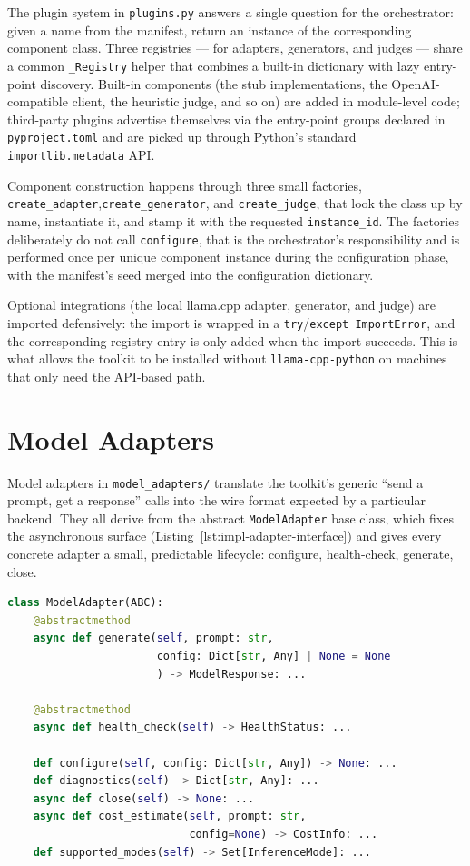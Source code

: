 The plugin system in \texttt{plugins.py} answers a single question for the orchestrator: given a name from the manifest, return an instance of the corresponding component class.
Three registries --- for adapters, generators, and judges --- share a common \texttt{\_Registry} helper that combines a built-in dictionary with lazy entry-point discovery.
Built-in components (the stub implementations, the OpenAI-compatible client, the heuristic judge, and so on) are added in module-level code; third-party plugins advertise themselves via the entry-point groups declared in \texttt{pyproject.toml} and are picked up through Python's standard \texttt{importlib.metadata} API.

Component construction happens through three small factories, \texttt{create\_adapter},\newline \texttt{create\_generator}, and \texttt{create\_judge}, that look the class up by name, instantiate it, and stamp it with the requested \texttt{instance\_id}.
The factories deliberately do not call \texttt{configure}, that is the orchestrator's responsibility and is performed once per unique component instance during the configuration phase, with the manifest's seed merged into the configuration dictionary.

Optional integrations (the local llama.cpp adapter, generator, and judge) are imported defensively: the import is wrapped in a \texttt{try}/\texttt{except ImportError}, and the corresponding registry entry is only added when the import succeeds.
This is what allows the toolkit to be installed without \texttt{llama-cpp-python} on machines that only need the API-based path.

\section{Model Adapters}\label{sec:impl-adapters}

Model adapters in \texttt{model\_adapters/} translate the toolkit's generic ``send a prompt, get a response'' calls into the wire format expected by a particular backend.
They all derive from the abstract \texttt{ModelAdapter} base class, which fixes the asynchronous surface (Listing~\ref{lst:impl-adapter-interface}) and gives every concrete adapter a small, predictable lifecycle: configure, health-check, generate, close.

\begin{lstlisting}[language=Python,caption={Model adapter interface.},label={lst:impl-adapter-interface}]
class ModelAdapter(ABC):
    @abstractmethod
    async def generate(self, prompt: str,
                       config: Dict[str, Any] | None = None
                       ) -> ModelResponse: ...

    @abstractmethod
    async def health_check(self) -> HealthStatus: ...

    def configure(self, config: Dict[str, Any]) -> None: ...
    def diagnostics(self) -> Dict[str, Any]: ...
    async def close(self) -> None: ...
    async def cost_estimate(self, prompt: str,
                            config=None) -> CostInfo: ...
    def supported_modes(self) -> Set[InferenceMode]: ...
\end{lstlisting}

